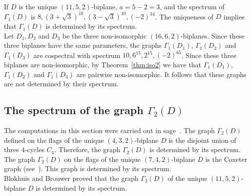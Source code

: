 \documentclass[letterpaper,10pt]{article}
\theoremstyle{plain}
\theoremstyle{definition}
\begin{document}
If $D$ is the unique $(11,5,2)$-biplane, $a=5-2=3$, and the spectrum of $\Gamma_1(D)$ is $8,(3+\sqrt{3})^{10},(3-\sqrt{3})^{10},(-2)^{34}$. 
The uniqueness of $D$ implies that $\Gamma_1(D)$ is determined by its spectrum.\\


Let $D_1,D_2$ and $D_3$ be the three non-isomorphic $(16,6,2)$-biplanes. %
Since these three biplanes have the same parameters, the  graphs $\Gamma_1(D_1)$, $\Gamma_1(D_2)$ and $\Gamma_1(D_3)$ are cospectral with  spectrum $10,6^{15},2^{15},(-2)^{65}$. 
Since these three biplanes are non-isomorphic, by Theorem~\ref{thm:iso2} we have that  $\Gamma_1(D_1)$, $\Gamma_1(D_2)$ and $\Gamma_1(D_3)$ are pairwise non-isomorphic. 
It follows that these graphs  are not determined by their spectrum.

\subsection{The spectrum of the graph $\Gamma_2(D)$}
The computations in this section were carried out in sage~\cite{sage}. 
The graph $\Gamma_2(D)$ defined on the flags of the unique $(4,3,2)$-biplane $D$ is the disjoint union of three $4$-cycles $C_4$. Therefore, the graph $\Gamma_2(D)$ is determined by its spectrum.\\

The graph $\Gamma_2(D)$ on the flags of the unique $(7,4,2)$-biplane $D$ is the Coxeter graph (see~\cite[Section 4.6]{GR}). 
This graph is  determined by its spectrum.\\

Blokhuis and Brouwer \cite{BB} proved that the graph $\Gamma_2(D)$ of the unique $(11,5,2)$-biplane $D$ is determined by its spectrum.\\
\end{document}
